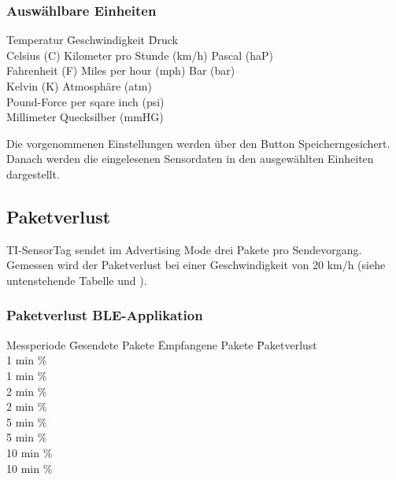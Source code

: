 \subsubsection*{Auswählbare Einheiten}
\begin{tabbing}
    Temperatur     \quad\= Geschwindigkeit            \quad\= Druck \\[0.8ex]
    Celsius (C)    \> Kilometer pro Stunde (km/h)\> Pascal (haP)\\
    Fahrenheit (F) \> Miles per hour (mph)       \> Bar (bar)\\
    Kelvin (K)     \>                            \> Atmosph\"{a}re (atm)\\
                   \>                      \> Pound-Force per sqare inch (psi)\\
                   \>                      \> Millimeter Quecksilber (mmHG)\\
\end{tabbing} 

  
Die vorgenommenen Einstellungen werden über den Button \glqq Speichern\grqq gesichert. Danach werden die eingelesenen Sensordaten in den ausgewählten Einheiten dargestellt.

\subsection{Paketverlust}

TI-SensorTag sendet im Advertising Mode drei Pakete pro Sendevorgang. Gemessen wird der Paketverlust bei einer Geschwindigkeit von 20 km/h (siehe untenstehende Tabelle und ).   

\subsubsection*{Paketverlust BLE-Applikation}
\begin{tabbing}
    Messperiode \quad\= Gesendete Pakete \quad\= Empfangene Pakete \quad\= Paketverlust\\[0.8ex]
    1 min      \thinspace\%  \\
    1 min      \thinspace\%  \\
    2 min      \thinspace\%  \\
    2 min      \thinspace\%  \\
    5 min      \thinspace\%  \\
    5 min      \thinspace\%  \\
    10 min      \thinspace\%  \\
    10 min      \thinspace\%  \\
\end{tabbing} 

